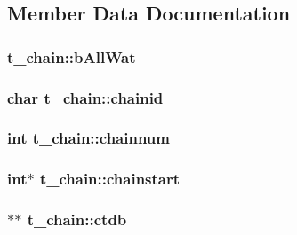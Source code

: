 \subsection{\-Member \-Data \-Documentation}
\hypertarget{structt__chain_a4588a56096065fad0233a3c62b7520d8}{
\subsubsection[{b\-All\-Wat}]{ {\bf t\-\_\-chain\-::b\-All\-Wat}}}\label{structt__chain_a4588a56096065fad0233a3c62b7520d8}
\hypertarget{structt__chain_a90cc899e9b199e8f9277cdde39dc0143}{
\subsubsection[{chainid}]{\setlength{\rightskip}{0pt plus 5cm}char {\bf t\-\_\-chain\-::chainid}}}\label{structt__chain_a90cc899e9b199e8f9277cdde39dc0143}
\hypertarget{structt__chain_a3f13bd2462df658afdf568ed9233168f}{
\subsubsection[{chainnum}]{\setlength{\rightskip}{0pt plus 5cm}int {\bf t\-\_\-chain\-::chainnum}}}\label{structt__chain_a3f13bd2462df658afdf568ed9233168f}
\hypertarget{structt__chain_a81448ac98b4276fcef4e54ea5fb5f44d}{
\subsubsection[{chainstart}]{\setlength{\rightskip}{0pt plus 5cm}int$\ast$ {\bf t\-\_\-chain\-::chainstart}}}\label{structt__chain_a81448ac98b4276fcef4e54ea5fb5f44d}
\hypertarget{structt__chain_a09dd880b5c8387c41f33c21a6be7b0da}{
\subsubsection[{ctdb}]{$\ast$$\ast$ {\bf t\-\_\-chain\-::ctdb}}}\label{structt__chain_a09dd880b5c8387c41f33c21a6be7b0da}
